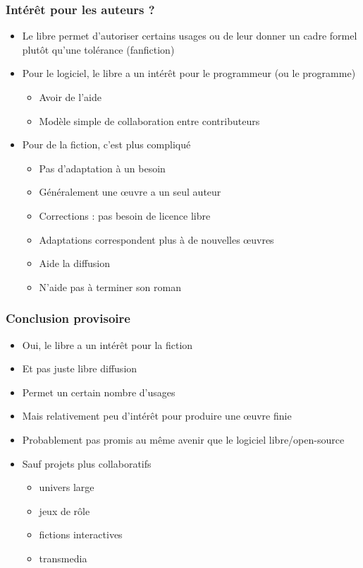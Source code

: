 \documentclass[11pt]{beamer}
\begin{document}
\begin{frame}
  \frametitle{Intérêt pour les auteurs ?}
  \begin{itemize}
  \item Le libre permet d'autoriser certains usages ou de leur donner
    un cadre formel plutôt qu'une tolérance (fanfiction)
    \item Pour le logiciel, le libre a un intérêt pour le programmeur
      (ou le programme)
      \begin{itemize}
      \item Avoir de l'aide
      \item Modèle simple de collaboration entre contributeurs
      \end{itemize}
    \item Pour de la fiction, c'est plus compliqué
      \begin{itemize}
      \item Pas d'adaptation à un besoin
      \item Généralement une œuvre a un seul auteur
      \item Corrections : pas besoin de licence libre
      \item Adaptations correspondent plus à de nouvelles œuvres
      \item Aide la diffusion
      \item N'aide pas à terminer son roman
      \end{itemize}
  \end{itemize}
\end{frame}

\begin{frame}
  \frametitle{Conclusion provisoire}
  \begin{itemize}
  \item Oui, le libre a un intérêt pour la fiction
  \item Et pas juste libre diffusion
  \item Permet un certain nombre d'usages
  \item Mais relativement peu d'intérêt pour produire une œuvre finie
  \item Probablement pas promis au même avenir que le logiciel
    libre/open-source
  \item Sauf projets plus collaboratifs
    \begin{itemize}
    \item univers large
    \item jeux de rôle
    \item fictions interactives
    \item transmedia
    \end{itemize}
  \end{itemize}
\end{frame}
\end{document}
